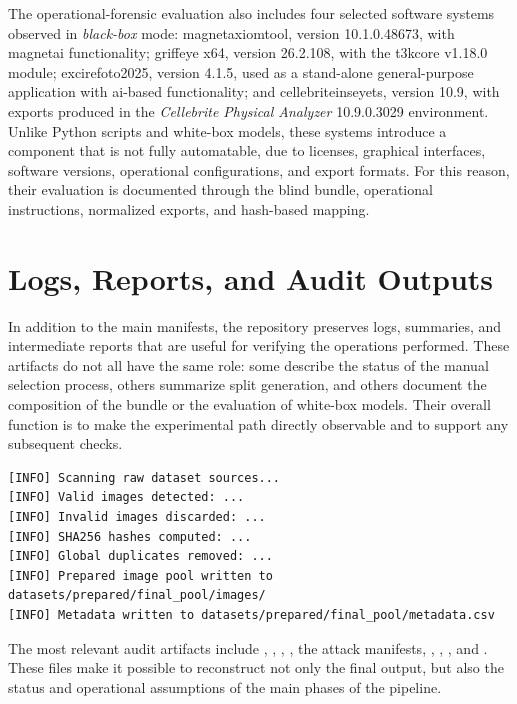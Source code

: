 The operational-forensic evaluation also includes four selected software systems
observed in \textit{black-box} mode: \gls{magnetaxiomtool}, version
10.1.0.48673, with \gls{magnetai} functionality; \gls{griffeye} x64, version
26.2.108, with the \gls{t3kcore} v1.18.0 module; \gls{excirefoto2025}, version
4.1.5, used as a stand-alone general-purpose application with \gls{ai}-based
functionality; and \gls{cellebriteinseyets}, version 10.9, with exports produced
in the \textit{Cellebrite Physical Analyzer} 10.9.0.3029 environment.
Unlike Python scripts and white-box models, these systems introduce a component that
is not fully automatable, due to licenses, graphical interfaces, software
versions, operational configurations, and export formats. For this reason, their
evaluation is documented through the blind bundle, operational instructions,
normalized exports, and hash-based mapping.


\section{Logs, Reports, and Audit Outputs}
\label{app:logs-reports-audit-outputs}

In addition to the main manifests, the repository preserves logs, summaries, and
intermediate reports that are useful for verifying the operations performed.
These artifacts do not all have the same role: some describe the status of the
manual selection process, others summarize split generation, and others document
the composition of the bundle or the evaluation of white-box models. Their overall
function is to make the experimental path directly observable and to support any
subsequent checks.

\begin{lstlisting}[caption={Schematic example of output from the dataset preparation phase.}, label={lst:dataset-preparation-log}]
[INFO] Scanning raw dataset sources...
[INFO] Valid images detected: ...
[INFO] Invalid images discarded: ...
[INFO] SHA256 hashes computed: ...
[INFO] Global duplicates removed: ...
[INFO] Prepared image pool written to datasets/prepared/final_pool/images/
[INFO] Metadata written to datasets/prepared/final_pool/metadata.csv
\end{lstlisting}

The most relevant audit artifacts include
, ,
,
, the attack manifests,
,
,
, and
.
These files make it possible to reconstruct not only the final output, but also
the status and operational assumptions of the main phases of the pipeline.


